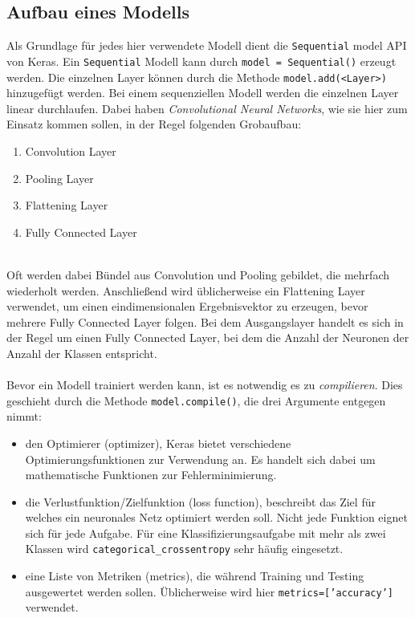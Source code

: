 \subsection{Aufbau eines Modells}
Als Grundlage für jedes hier verwendete Modell dient die \texttt{Sequential} model API von Keras. Ein \texttt{Sequential} Modell kann durch \texttt{model = Sequential()} erzeugt werden. Die einzelnen Layer können durch die Methode \texttt{model.add(<Layer>)} hinzugefügt werden.
Bei einem sequenziellen Modell werden die einzelnen Layer linear durchlaufen. Dabei haben \textit{Convolutional Neural Networks}, wie sie hier zum Einsatz kommen sollen, in der Regel folgenden Grobaufbau:
\begin{enumerate}
	\item Convolution Layer
	\item Pooling Layer
	\item Flattening Layer
	\item Fully Connected Layer
\end{enumerate} \ \\
Oft werden dabei Bündel aus Convolution und Pooling gebildet, die mehrfach wiederholt werden. Anschließend wird üblicherweise ein Flattening Layer verwendet, um einen eindimensionalen Ergebnisvektor zu erzeugen, bevor mehrere Fully Connected Layer folgen. Bei dem Ausgangslayer handelt es sich in der Regel um einen Fully Connected Layer, bei dem die Anzahl der Neuronen der Anzahl der Klassen entspricht. \\
\\
Bevor ein Modell trainiert werden kann, ist es notwendig es zu \textit{compilieren}. Dies geschieht durch die Methode \texttt{model.compile()}, die drei Argumente entgegen nimmt:

\begin{itemize}
	\item den Optimierer (optimizer), Keras bietet verschiedene Optimierungsfunktionen zur Verwendung an. Es handelt sich dabei um mathematische Funktionen zur Fehlerminimierung. 
	\item die Verlustfunktion/Zielfunktion (loss function), beschreibt das Ziel für welches ein neuronales Netz optimiert werden soll. Nicht jede Funktion eignet sich für jede Aufgabe. Für eine Klassifizierungsaufgabe mit mehr als zwei Klassen wird \texttt{categorical\_crossentropy} sehr häufig eingesetzt.
	\item eine Liste von Metriken (metrics), die während Training und Testing ausgewertet werden sollen. Üblicherweise wird hier \texttt{metrics=['accuracy']} verwendet.
\end{itemize}


